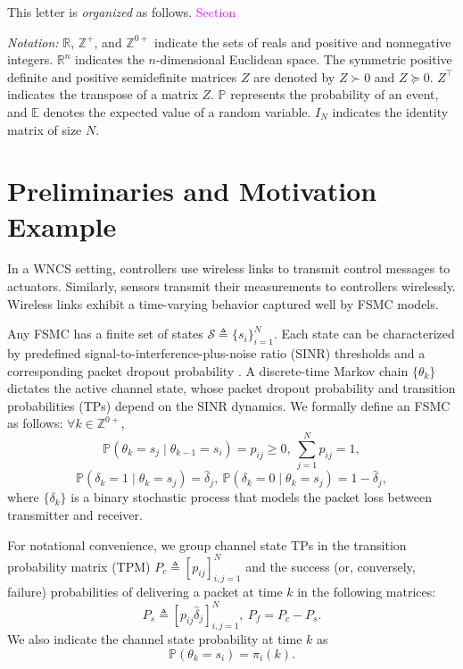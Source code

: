 \documentclass[journal,twoside,web]{ieeecolor}
\begin{document}
This letter is \emph{organized} as follows. 
\textcolor{magenta}{Section}

\textit{Notation:} $\mathbb{R}$, $\mathbb{Z}^{+}$, and $\mathbb{Z}^{0+}$ indicate the sets of reals and positive and nonnegative integers. $\mathbb{R}^{n}$ indicates the $n$-dimensional Euclidean space. The symmetric positive definite and positive semidefinite matrices $Z$ are denoted by $Z\succ 0$ and $Z\succeq 0$. $Z^{\top}$ indicates the transpose of a matrix $Z$. $\mathbb{P}$ represents the probability of an event, and $\mathbb{E}$ denotes the expected value of a random variable. $I_N$ indicates the identity matrix of size $N$.%

\section{Preliminaries and Motivation Example}\label{sec:model}
In a WNCS setting, controllers use wireless links to transmit control messages to actuators. 
Similarly, sensors transmit their measurements to controllers wirelessly. Wireless links exhibit a time-varying behavior captured well by FSMC models. 

Any FSMC has a finite set of states $\mathcal{S}\triangleq\{s_i\}_{i=1}^{N}$. Each state can be characterized by predefined signal-to-interference-plus-noise ratio (SINR) thresholds and a corresponding packet dropout probability \cite{zacchialun2024access}. A discrete-time Markov chain $\{\theta_k\}$ dictates the active channel state, whose packet dropout probability and transition probabilities (TPs) depend on the SINR dynamics. We formally define an FSMC as follows: $\forall k\in \mathbb{Z}^{0+}$,
\begin{equation}\label{eq:p-ij}
    \mathbb{P}(\theta_{k} = s_j \mid \theta_{k-1} = s_i) = p_{ij} \geq 0,~ \sum_{j=1}^N p_{ij} = 1,
\end{equation}
\begin{equation}\label{eq:p-delta}
    \mathbb{P}(\delta_k = 1 \mid \theta_{k} = s_j) = \hat{\delta}_{j},~
    \mathbb{P}(\delta_k = 0 \mid \theta_{k} = s_j) = 1 - \hat{\delta}_{j},
\end{equation}
where $\{\delta_k\}$ is a binary stochastic process that models the packet loss between transmitter and receiver.

For notational convenience, we group
channel state TPs in the transition probability matrix (TPM) $P_{c}^{} \triangleq \left[p_{ij}\right]_{i,j=1}^{N}$
and the  success (or, conversely, failure) probabilities of delivering a packet at time $k$ in the following matrices:
\begin{equation}\label{eq:Ps}
    P_{s}^{} \triangleq \left[p_{ij}\hat{\delta}_{j}\right]_{i,j=1}^{N},~P_{f} = P_{c} - P_{s}.
\end{equation}
We also indicate the channel state probability at time $k$ as
\begin{equation}\label{eq:pik}
     \mathbb{P}(\theta_{k} = s_i) = \pi_{i}(k).
\end{equation}
\end{document}
